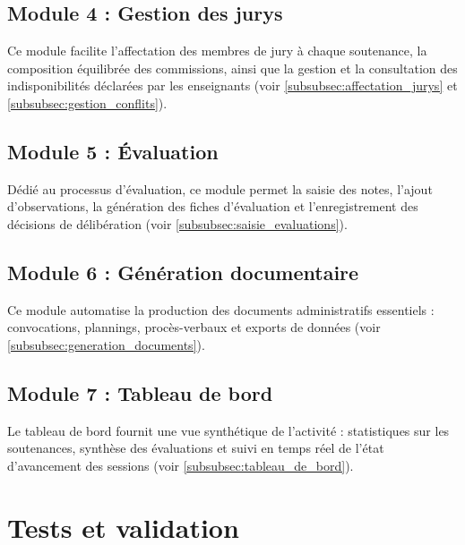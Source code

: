 \documentclass[12pt,a4paper]{article}
\begin{document}
\subsection{Module 4 : Gestion des jurys}
\label{subsec:module_jurys}

Ce module facilite l'affectation des membres de jury à chaque soutenance, la
composition équilibrée des commissions, ainsi que la gestion et la consultation
des indisponibilités déclarées par les enseignants (voir
\ref{subsubsec:affectation_jurys} et \ref{subsubsec:gestion_conflits}).

\subsection{Module 5 : Évaluation}
\label{subsec:module_evaluation}

Dédié au processus d'évaluation, ce module permet la saisie des notes, l'ajout
d'observations, la génération des fiches d'évaluation et l'enregistrement des
décisions de délibération (voir \ref{subsubsec:saisie_evaluations}).

\subsection{Module 6 : Génération documentaire}
\label{subsec:module_documents}

Ce module automatise la production des documents administratifs essentiels :
convocations, plannings, procès-verbaux et exports de données (voir
\ref{subsubsec:generation_documents}).

\subsection{Module 7 : Tableau de bord}
\label{subsec:module_dashboard}

Le tableau de bord fournit une vue synthétique de l'activité : statistiques sur
les soutenances, synthèse des évaluations et suivi en temps réel de l'état
d'avancement des sessions (voir \ref{subsubsec:tableau_de_bord}).

\section{Tests et validation}
\label{sec:tests}
\end{document}

